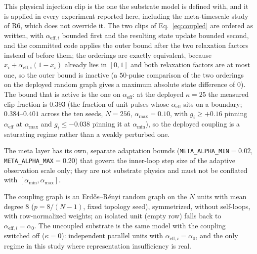 \documentclass[preprint,12pt]{elsarticle}
\begin{document}
This physical injection clip is the one
the substrate model is defined with, and it is applied in every experiment
reported here, including the meta-timescale study of R6, which does not
override it. The two clips of Eq.~\eqref{eq:coupled} are ordered as written,
with $\alpha_{\mathrm{eff},i}$ bounded first and the resulting state update
bounded second, and the committed code applies the outer bound after the two
relaxation factors instead of before them; the orderings are exactly
equivalent, because $x_i+\alpha_{\mathrm{eff},i}(1-x_i)$ already lies in
$[0,1]$ and both relaxation factors are at most one, so the outer bound is
inactive (a $50$-pulse comparison of the two orderings on the deployed random
graph gives a maximum absolute state difference of $0$). The bound that is
active is the one on $\alpha_{\mathrm{eff}}$: at the deployed $\kappa=25$ the
measured clip fraction is $0.393$ (the fraction of unit-pulses whose
$\alpha_{\mathrm{eff}}$ sits on a boundary; $0.384$--$0.401$ across the ten
seeds, $N=256$, $\alpha_{\max}=0.10$, with $g_i\geq+0.16$ pinning
$\alpha_{\mathrm{eff}}$ at $\alpha_{\max}$ and $g_i\leq-0.038$ pinning it at
$\alpha_{\min}$), so the deployed coupling is a saturating regime rather than a
weakly perturbed one.

The meta layer has its own, separate adaptation bounds
(\texttt{META\_ALPHA\_MIN}\allowbreak$=0.02$,
\texttt{META\_ALPHA\_MAX}\allowbreak$=0.20$) that
govern the inner-loop step size of the adaptive observation scale only; they
are not substrate physics and must not be conflated with
$[\alpha_{\min},\alpha_{\max}]$.

The coupling graph is an Erd\H{o}s--R\'enyi
random graph on the $N$ units with mean degree $8$
($p=8/(N-1)$, fixed topology seed), symmetrized, without self-loops, with
row-normalized weights; an isolated unit (empty row) falls back to
$\alpha_{\mathrm{eff},i}=\alpha_0$. The uncoupled substrate is the same model
with the coupling switched off ($\kappa=0$): independent parallel units with
$\alpha_{\mathrm{eff},i}=\alpha_0$, and the only regime in this study where
representation insufficiency is real.
\end{document}
